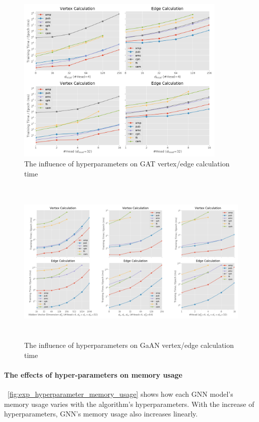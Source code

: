 \begin{figure}
    \centering
    \includegraphics[height=8cm]{figs/experiments/exp_hyperparameter_on_vertex_edge_phase_time_gat.png}
    \caption{The influence of hyperparameters on GAT vertex/edge calculation time}
    \label{fig:exp_hyperparameter_on_vertex_edge_phase_time_gat}
\end{figure}

\begin{figure}
    \centering
    \includegraphics[height=8cm]{figs/experiments/exp_hyperparameter_on_vertex_edge_phase_time_gaan.png}
    \caption{The influence of hyperparameters on GaAN vertex/edge calculation time}
    \label{fig:exp_hyperparameter_on_vertex_edge_phase_time_gaan}
\end{figure}

\paragraph{The effects of hyper-parameters on memory usage}
\figurename~\ref{fig:exp_hyperparameter_memory_usage} shows how each GNN model's memory usage varies with the algorithm's hyperparameters.
With the increase of hyperparameters, GNN's memory usage also increases linearly.

